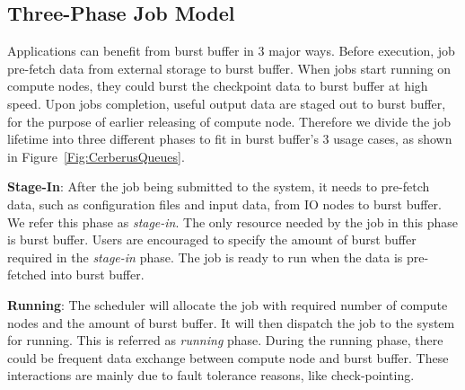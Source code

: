 

\subsection{Three-Phase Job Model}
Applications can benefit from burst buffer in 3 major ways\cite{BBUseCase}.
Before execution, job pre-fetch data from external storage to burst buffer.
When jobs start running on compute nodes,
they could burst the checkpoint data to burst buffer at high speed.
Upon jobs completion, useful output data are staged out to burst buffer,
for the purpose of earlier releasing of compute node.
Therefore we divide the job lifetime into three different phases to
fit in burst buffer's 3 usage cases,
as shown in Figure~\ref{Fig:CerberusQueues}.

\textbf{Stage-In}: After the job being submitted to the system,
         it needs to pre-fetch data, such as configuration files and input data,
         from IO nodes to burst buffer. We refer this phase as \textit{stage-in}.
         The only resource needed by the job in this phase is burst buffer.
         Users are encouraged to specify the amount of burst buffer required in the \textit{stage-in} phase.
         The job is ready to run when the data is pre-fetched into burst buffer.
 
\textbf{Running}: The scheduler will allocate the job with required
         number of compute nodes and the amount of burst buffer. 
         It will then dispatch the job to the system for running.
         This is referred as \textit{running} phase.
         During the running phase, there could be frequent data exchange
         between compute node and burst buffer.
         These interactions are mainly due to fault tolerance reasons, like check-pointing. 
 
